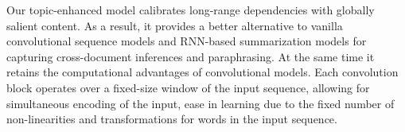 Our topic-enhanced model calibrates long-range dependencies with
globally salient content. As a result, it provides a better
alternative to vanilla convolutional sequence models
\cite{convseq2seq} and RNN-based summarization models \cite{see-acl17}
for capturing cross-document inferences and paraphrasing.  At the same
time it retains the computational advantages of convolutional
models. Each convolution block operates over a fixed-size window of
the input sequence, allowing for simultaneous encoding of the input,
ease in learning due to the fixed number of non-linearities and
transformations for words in the input sequence.





